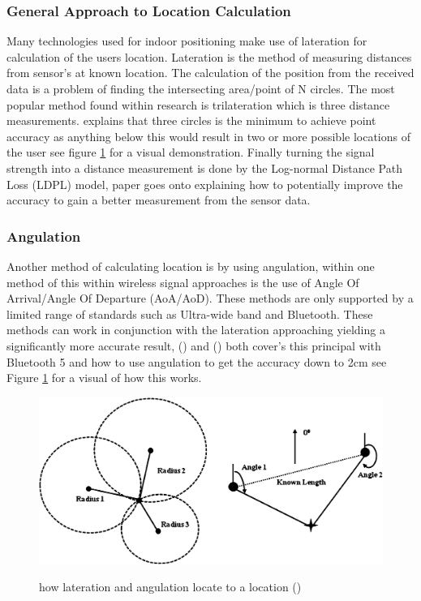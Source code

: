 \subsubsection{General Approach to Location Calculation}
Many technologies used for indoor positioning make use of lateration for calculation of the users location. Lateration is the method of measuring distances from sensor's at known location. The calculation of the position from the received data is a problem of finding the intersecting area/point of N circles. The most popular method found within research is trilateration which is three distance measurements. \cite{shchekotov_2015_indoor} explains that three circles is the minimum to achieve point accuracy as anything below this would result in two or more possible locations of the user see figure \ref{fig:latandang} for a visual demonstration. Finally turning the signal strength into a distance measurement is done by the Log-normal Distance Path Loss (LDPL) model, \cite{yang_2018_an} paper goes onto explaining how to potentially improve the accuracy to gain a better measurement from the sensor data.
 
\subsubsection{Angulation}
Another method of calculating location is by using angulation, within one method of this within wireless signal approaches is the use of Angle Of Arrival/Angle Of Departure (AoA/AoD). These methods are only supported by a limited range of standards such as Ultra-wide band and Bluetooth. These methods can work in conjunction with the lateration approaching yielding a significantly more accurate result, (\cite{mysticmedia_2020_the}) and (\cite{lehtimki_bluetooth}) both cover's this principal with Bluetooth 5 and how to use angulation to get the accuracy down to 2cm see Figure \ref{fig:latandang} for a visual of how this works.

\begin{figure}[h]
	\includegraphics[width=\linewidth]{images/research/distanceandaoa.png}\\
	\caption{how lateration and angulation locate to a location (\cite{kim_2013_rfidbased})}
	\label{fig:latandang}
\end{figure}

